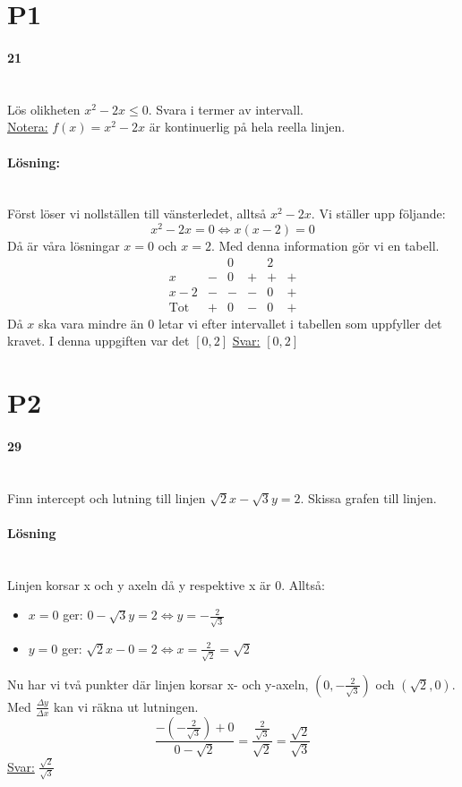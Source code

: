 \section*{P1}
\paragraph{21}~\\
Lös olikheten $x^2-2x\leq 0$. Svara i termer av intervall.\\
\underline{Notera:} $f(x)=x^2-2x$ är kontinuerlig på hela reella linjen.
\paragraph{Lösning:}~\\
Först löser vi nollställen till vänsterledet, alltså $x^2-2x$.
Vi ställer upp följande:
\begin{equation*}
    x^2-2x=0\Leftrightarrow x(x-2)=0
\end{equation*}
Då är våra lösningar $x=0$ och $x=2$.
Med denna information gör vi en tabell.
\begin{equation*}
    \begin{matrix}
                   &   & 0 &   & 2 &   \\
        x          & - & 0 & + & + & + \\
        x-2        & - & - & - & 0 & + \\
        \text{Tot} & + & 0 & - & 0 & +
    \end{matrix}
\end{equation*}
Då $x$ ska vara mindre än $0$ letar vi efter intervallet i tabellen som uppfyller det kravet.
I denna uppgiften var det $[0,2]$
\underline{Svar:} $[0,2]$
\section*{P2}
\paragraph{29}~\\
Finn intercept och lutning till linjen $\sqrt{2}x-\sqrt{3}y=2$. Skissa grafen till linjen.
\paragraph{Lösning}~\\
Linjen korsar x och y axeln då y respektive x är 0.
Alltså:
\begin{itemize}
    \item $x=0$ ger: $0-\sqrt{3}y=2\Leftrightarrow y=-\frac{2}{\sqrt{3}}$
    \item $y=0$ ger: $\sqrt{2}x-0=2\Leftrightarrow x=\frac{2}{\sqrt{2}}=\sqrt{2}$
\end{itemize}
Nu har vi två punkter där linjen korsar x- och y-axeln, $(0, -\frac{2}{\sqrt{3}})$ och $(\sqrt{2}, 0)$.
Med $\frac{\Delta y}{\Delta   x}$ kan vi räkna ut lutningen.
\begin{equation*}
    \frac{-(-\frac{2}{\sqrt{3}})+0}{0-\sqrt{2}}=
    \frac{\frac{2}{\sqrt{3}}}{\sqrt{2}}=
    \frac{\sqrt{2}}{\sqrt{3}}
\end{equation*}
\underline{Svar:} $\frac{\sqrt{2}}{\sqrt{3}}$

